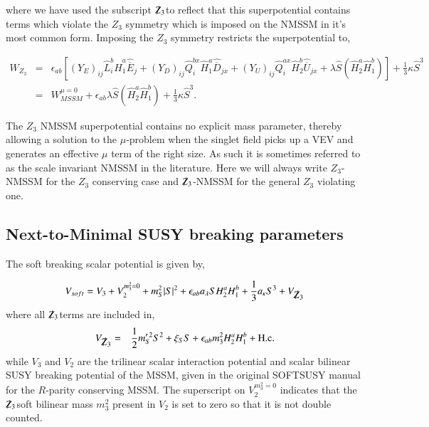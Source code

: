 \documentclass[final,3p,times,pdflatex]{elsarticle}
\newcommand{\be}{\begin{equation}}
\newcommand{\ee}{\end{equation}}
\newcommand{\ba}{\begin{eqnarray}}
\newcommand{\ea}{\end{eqnarray}}
\newcommand{\Zv}{{\mbox{$\slashed{Z}_{3}$}}} %
\begin{document}
\noindent where we have used the subscript \Zv to reflect that this superpotential contains terms which violate the $Z_3$ symmetry which is imposed on the NMSSM in it's most common form.  Imposing the $Z_3$ symmetry restricts the superpotential to,

\ba 
 W_{Z_3} &=& \epsilon_{ab} \left[ (Y_E)_{ij} \hat L_i^b
\hat H_1^a \hat{\overline E}_j + (Y_D)_{ij} \hat Q_i^{bx} \hat H_1^a \hat{\overline D}_{jx} +
(Y_U)_{ij} \hat Q_i^{ax} \hat H_2^b \hat{\overline U}_{jx}  
+\lambda \hat{S}(\hat{H}^a_2 \hat{H}^b_1) \right ]+\frac{1}{3}\kappa\hat{S}^3 \\
 &=& W_{MSSM}^{\mu =0}  + \epsilon_{ab} \lambda \hat{S} (\hat{H}^a_2 \hat{H}^b_1) +\frac{1}{3}\kappa\hat{S}^3.
\label{eq:WZ3C}
\ea


\noindent The $Z_3$ NMSSM superpotential contains no explicit mass parameter, thereby allowing a solution to the $\mu$-problem when the singlet field picks up a VEV and generates an effective $\mu$ term of the right size.   As such it is sometimes referred to as the scale invariant NMSSM in the literature.  Here we will always write $Z_3$-NMSSM for the $Z_3$ conserving case and \Zv-NMSSM for the general $Z_3$ violating one. 


\subsection{Next-to-Minimal SUSY breaking parameters \label{sec:susybreak}}
The soft breaking scalar potential is given by,

\be V_{soft} = V_3 + V^{m_3^2 = 0}_2 + m_S^2|S|^2 + \epsilon_{ab} a_\lambda S H^a_2 H^b_1 + \frac{1}{3} a_\kappa S^3 + V_\Zv \ee where all \Zv terms are included in,
\ba V_\Zv & = & \frac{1}{2}m_S^{\prime \, 2} S^2 + \xi_S S + \epsilon_{ab} m_3^2 H_2^a H_1^b + \textrm{H.c.} \ea while $V_3$ and $V_2$ are the trilinear scalar interaction potential and scalar bilinear SUSY breaking potential of the MSSM, given in the original SOFTSUSY manual for the $R$-parity conserving MSSM\cite{Allanach:2001kg}.   The superscript on $V^{m_3^2 = 0}_2$ indicates that the \Zv soft bilinear mass $m_3^2$ present in $V_2$ is set to zero so that it is not double counted. 

\end{document}
